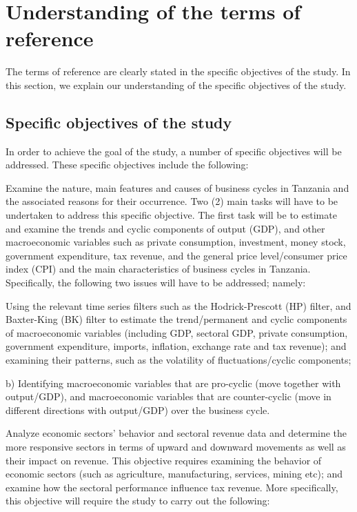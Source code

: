\documentclass[12pt,a4paper,final]{article}
\begin{document}
\section{Understanding of the terms of reference}

The terms of reference are clearly stated in the specific objectives of the study. In this section, we explain our understanding of the specific objectives of the study.


\subsection{Specific objectives of the study}
In order to achieve the goal of the study, a number of specific objectives will be addressed.  These specific objectives include the following:

\begin{compactenum}[1)]
\item Examine the nature, main features and causes of business cycles in Tanzania and the associated reasons for their occurrence. Two (2) main tasks will have to be undertaken to address this specific objective. The first task will be to estimate and examine the trends and cyclic components of output (GDP), and other macroeconomic variables such as private consumption, investment, money stock, government expenditure, tax revenue, and the general price level/consumer price index (CPI) and the main characteristics of business cycles in Tanzania.  Specifically, the following two issues will have to be addressed; namely:
\begin{compactenum}[(i)]

\item	Using the relevant time series filters such as the Hodrick-Prescott (HP) filter, and Baxter-King (BK) filter to estimate the trend/permanent and cyclic components of macroeconomic variables (including GDP, sectoral GDP, private consumption, government expenditure, imports, inflation, exchange rate and tax revenue); and examining their patterns, such as the volatility of fluctuations/cyclic components;

\item b)	Identifying macroeconomic variables that are pro-cyclic (move together with output/GDP), and macroeconomic variables that are counter-cyclic (move in different directions with output/GDP) over the business cycle.
\end{compactenum}  

\item	Analyze economic sectors' behavior and  sectoral revenue data and determine the more responsive sectors in terms of upward and downward movements as well as their impact on revenue. This objective requires examining the behavior of economic sectors (such as agriculture, manufacturing, services, mining etc); and examine how the sectoral performance influence tax revenue.  More specifically, this objective will require the study to carry out the following:


\end{compactenum}
\end{document}
